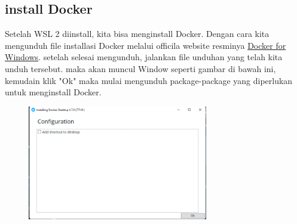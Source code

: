 \documentclass[11pt,a4paper]{article}
\begin{document}
\subsection{install Docker}
Setelah WSL 2 diinstall, kita bisa menginstall Docker. Dengan cara kita mengunduh file installasi Docker melalui officila website resminya
\href{https://docs.docker.com/desktop/windows/install/}{Docker for Windows}. setelah selesai mengunduh, jalankan file
unduhan yang telah kita unduh tersebut. maka akan muncul Window seperti gambar di bawah ini, kemudain klik "Ok" maka mulai mengunduh
package-package yang diperlukan untuk menginstall Docker.
\begin{figure}[h]
	\centering
	\includegraphics[width=0.7\textwidth]{Figure/asset/1.png}
\end{figure}
\end{document}

